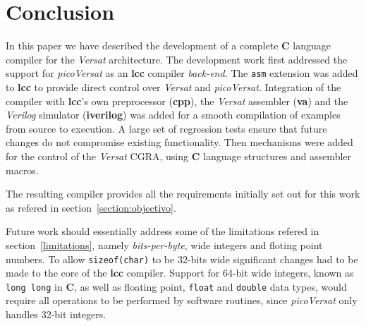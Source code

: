 \documentclass[journal]{IEEEtran}
\begin{document}
\section{Conclusion}

In this paper we have described the development of a complete {\bf C}
language compiler for the {\it Versat} architecture.
The development work first addressed the support for {\it picoVersat} as an
{\bf lcc} compiler {\it back-end}.
The {\tt asm} extension was added to {\bf lcc} to provide direct control
over {\it Versat} and {\it picoVersat}.
Integration of the compiler with {\bf lcc}'s own preprocessor ({\bf cpp}),
the {\it Versat} assembler ({\bf va}) and the {\it Verilog} simulator
({\bf iverilog}) was added for a smooth compilation of examples from source
to execution.
A large set of regression tests ensure that future changes do not compromise
existing functionality.
Then mechanisms were added for the control of the {\it Versat} {\sc CGRA},
using {\bf C} language structures and assembler macros.

The resulting compiler provides all the requirements initially set out for
this work as refered in section~\ref{section:objectivo}.

Future work should essentially address some of the limitations refered in
section~\ref{limitations}, namely {\it bits-per-byte}, wide integers and
floting point numbers.
To allow {\tt sizeof(char)} to be 32-bits wide significant changes had to be
made to the core of the {\bf lcc} compiler.
Support for 64-bit wide integers, known as {\tt long long} in {\bf C}, as
well as floating point, {\tt float} and {\tt double} data types, would
require all operations to be performed by software routines, since
{\it picoVersat} only handles 32-bit integers.





\end{document}
